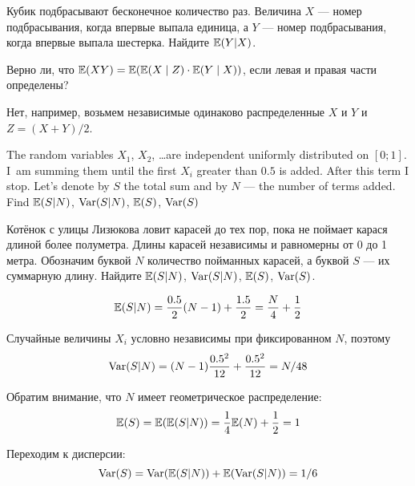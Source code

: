 \begin{problem}
Кубик подбрасывают бесконечное количество раз. Величина $X$ — номер подбрасывания, когда впервые выпала единица, а $Y$ — номер подбрасывания, когда впервые выпала шестерка. Найдите $\mathbb{E}(Y|X)$.

\begin{sol}

\end{sol}
\end{problem}

\begin{problem}
Верно ли, что $\mathbb{E}(XY)=\mathbb{E}(\mathbb{E}(X\mid Z)\cdot \mathbb{E}(Y\mid X))$, если левая и правая части определены?

\begin{sol}
Нет, например, возьмем независимые одинаково распределенные $X$ и $Y$ и $Z=(X+Y)/2$.
\end{sol}
\end{problem}

\begin{problem}
The random variables $X_1$, $X_2$, \ldots are independent uniformly distributed on $[0;1]$. I~am summing them until the first $X_i$ greater than $0.5$ is added. After this term I stop. Let's denote by $S$ the total sum and by $N$ — the number of terms added. Find $\mathbb{E}(S|N)$, $\operatorname{Var}(S|N)$, $\mathbb{E}(S)$, $\operatorname{Var}(S)$

Котёнок с улицы Лизюкова ловит карасей до тех пор, пока не поймает карася длиной более полуметра. Длины карасей независимы и равномерны от 0 до 1 метра. Обозначим буквой $N$ количество пойманных карасей, а буквой $S$ — их суммарную длину. Найдите $\mathbb{E}(S|N)$, $\operatorname{Var}(S|N)$, $\mathbb{E}(S)$, $\operatorname{Var}(S)$.

\begin{sol}
\[
\mathbb{E}(S|N)= \frac{0.5}{2} (N-1) + \frac{1.5}{2} = \frac{N}{4}+\frac{1}{2}
\]

Случайные величины $X_i$ условно независимы при фиксированном $N$, поэтому
\[
\operatorname{Var}(S|N) = (N-1)\frac{0.5^2}{12} + \frac{0.5^2}{12} = N/48
\]

Обратим внимание, что $N$ имеет геометрическое распределение:
\[
\mathbb{E}(S)=\mathbb{E}(\mathbb{E}(S|N))=\frac{1}{4}\mathbb{E}(N)+\frac{1}{2}=1
\]

Переходим к дисперсии:
\[
\operatorname{Var}(S)=\operatorname{Var}(\mathbb{E}(S|N)) + \mathbb{E}(\operatorname{Var}(S|N)) = 1/6
\]


\end{sol}
\end{problem}

